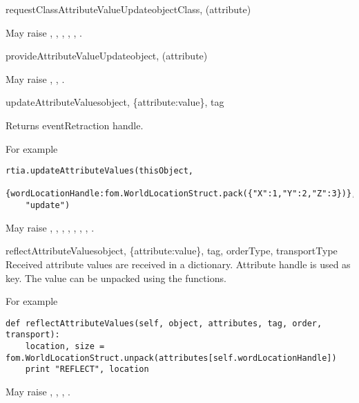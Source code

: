 \begin{methoddesc}{requestClassAttributeValueUpdate}{objectClass, (attribute)}

May raise
,
,
,
,
,
.
\end{methoddesc}

\begin{methoddesc}{provideAttributeValueUpdate}{object, (attribute)}

May raise
,
,
.
\end{methoddesc}

\begin{methoddesc}{updateAttributeValues}{object, \{attribute:value\}, tag}

Returns eventRetraction handle.

For example
\begin{verbatim}
rtia.updateAttributeValues(thisObject,
    {wordLocationHandle:fom.WorldLocationStruct.pack({"X":1,"Y":2,"Z":3})},
    "update")
\end{verbatim}

May raise
,
,
,
,
,
,
,
.
\end{methoddesc}

\begin{methoddesc}{reflectAttributeValues}{object, \{attribute:value\}, tag, orderType, transportType}
Received attribute values are received in a dictionary. Attribute handle is used as key.
The value can be unpacked using the  functions.

For example
\begin{verbatim}
def reflectAttributeValues(self, object, attributes, tag, order, transport):
    location, size = fom.WorldLocationStruct.unpack(attributes[self.wordLocationHandle])
    print "REFLECT", location
\end{verbatim}

May raise
,
,
,
.
\end{methoddesc}

